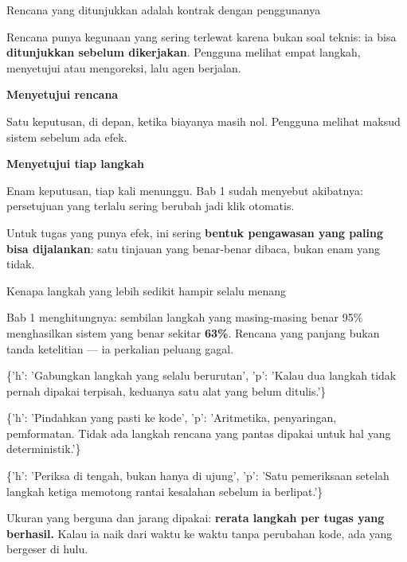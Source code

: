 \documentclass[aspectratio=169,11pt,t]{beamer}
\begin{document}
\begin{frame}[shrink=25]{Rencana yang ditunjukkan adalah kontrak dengan penggunanya}
{\fontsize{9.4}{12.6}\selectfont\color{fg2}Rencana punya kegunaan yang sering terlewat karena bukan soal teknis: ia bisa \textbf{ditunjukkan sebelum dikerjakan}. Pengguna melihat empat langkah, menyetujui atau mengoreksi, lalu agen berjalan.\par}\vskip 4pt
\begin{minipage}[t]{0.485\textwidth}
{\fontsize{9.4}{12.6}\selectfont\color{fg2}\textbf{Menyetujui rencana}\par}\vskip 4pt
{\fontsize{9.4}{12.6}\selectfont\color{fg2}Satu keputusan, di depan, ketika biayanya masih nol. Pengguna melihat maksud sistem sebelum ada efek.\par}\vskip 4pt

\end{minipage}%
\hfill
\begin{minipage}[t]{0.485\textwidth}
{\fontsize{9.4}{12.6}\selectfont\color{fg2}\textbf{Menyetujui tiap langkah}\par}\vskip 4pt
{\fontsize{9.4}{12.6}\selectfont\color{fg2}Enam keputusan, tiap kali menunggu. Bab 1 sudah menyebut akibatnya: persetujuan yang terlalu sering berubah jadi klik otomatis.\par}\vskip 4pt

\end{minipage}%
\begin{iband}[signal]
Untuk tugas yang punya efek, ini sering \textbf{bentuk pengawasan yang paling bisa dijalankan}: satu tinjauan yang benar-benar dibaca, bukan enam yang tidak.
\end{iband}
\end{frame}

\begin{frame}[shrink=25]{Kenapa langkah yang lebih sedikit hampir selalu menang}
{\fontsize{9.4}{12.6}\selectfont\color{fg2}Bab 1 menghitungnya: sembilan langkah yang masing-masing benar 95\% menghasilkan sistem yang benar sekitar \textbf{63\%}. Rencana yang panjang bukan tanda ketelitian --- ia perkalian peluang gagal.\par}\vskip 4pt
\begin{isteps}
\item \{'h': 'Gabungkan langkah yang selalu berurutan', 'p': 'Kalau dua langkah tidak pernah dipakai terpisah, keduanya satu alat yang belum ditulis.'\}
\item \{'h': 'Pindahkan yang pasti ke kode', 'p': 'Aritmetika, penyaringan, pemformatan. Tidak ada langkah rencana yang pantas dipakai untuk hal yang deterministik.'\}
\item \{'h': 'Periksa di tengah, bukan hanya di ujung', 'p': 'Satu pemeriksaan setelah langkah ketiga memotong rantai kesalahan sebelum ia berlipat.'\}
\end{isteps}
\begin{iband}[signal]
Ukuran yang berguna dan jarang dipakai: \textbf{rerata langkah per tugas yang berhasil.} Kalau ia naik dari waktu ke waktu tanpa perubahan kode, ada yang bergeser di hulu.
\end{iband}
\end{frame}
\end{document}
